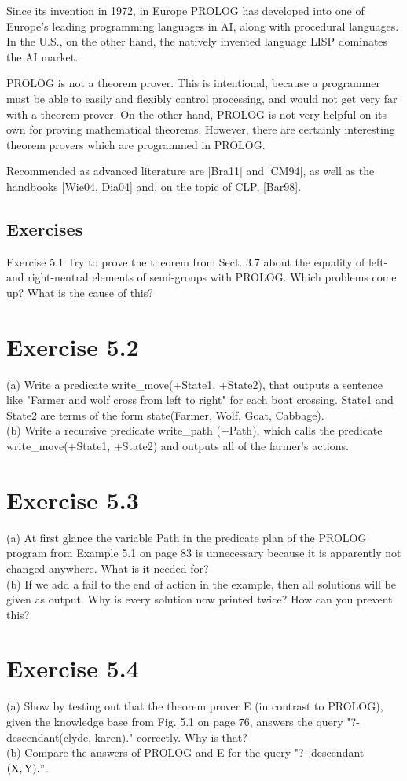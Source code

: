 \documentclass[10pt]{article}
\begin{document}
Since its invention in 1972, in Europe PROLOG has developed into one of Europe's leading programming languages in AI, along with procedural languages. In the U.S., on the other hand, the natively invented language LISP dominates the AI market.

PROLOG is not a theorem prover. This is intentional, because a programmer must be able to easily and flexibly control processing, and would not get very far with a theorem prover. On the other hand, PROLOG is not very helpful on its own for proving mathematical theorems. However, there are certainly interesting theorem provers which are programmed in PROLOG.

Recommended as advanced literature are [Bra11] and [CM94], as well as the handbooks [Wie04, Dia04] and, on the topic of CLP, [Bar98].

\subsection*{Exercises}
Exercise 5.1 Try to prove the theorem from Sect. 3.7 about the equality of left- and right-neutral elements of semi-groups with PROLOG. Which problems come up? What is the cause of this?

\section*{Exercise 5.2}
(a) Write a predicate write\_move(+State1, +State2), that outputs a sentence like "Farmer and wolf cross from left to right" for each boat crossing. State1 and State2 are terms of the form state(Farmer, Wolf, Goat, Cabbage).\\
(b) Write a recursive predicate write\_path (+Path), which calls the predicate write\_move(+State1, +State2) and outputs all of the farmer's actions.

\section*{Exercise 5.3}
(a) At first glance the variable Path in the predicate plan of the PROLOG program from Example 5.1 on page 83 is unnecessary because it is apparently not changed anywhere. What is it needed for?\\
(b) If we add a fail to the end of action in the example, then all solutions will be given as output. Why is every solution now printed twice? How can you prevent this?

\section*{Exercise 5.4}
(a) Show by testing out that the theorem prover E (in contrast to PROLOG), given the knowledge base from Fig. 5.1 on page 76, answers the query "?- descendant(clyde, karen)." correctly. Why is that?\\
(b) Compare the answers of PROLOG and E for the query "?- descendant $(\mathrm{X}, \mathrm{Y}) . "$.
\end{document}
